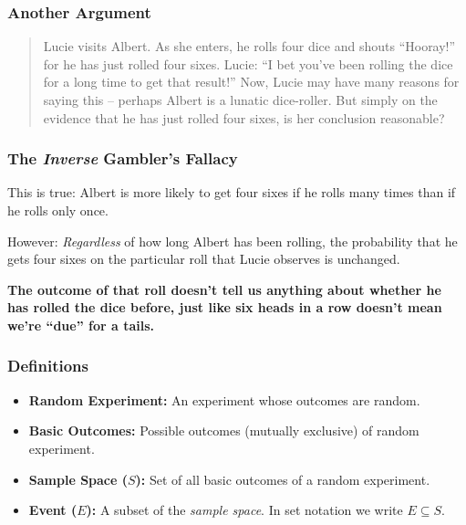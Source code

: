 \documentclass{beamer}
\begin{document}
\begin{frame}
\frametitle{Another Argument}
	\begin{quote}
	Lucie visits Albert. As she enters, he rolls four dice and shouts ``Hooray!'' for he has just rolled 
	four sixes. Lucie: ``I bet you've been rolling the dice for a long time to get that result!'' Now, Lucie 
	may have many reasons for saying this -- perhaps Albert is a lunatic dice-roller. But simply on the 
	evidence that he has just rolled four sixes, is her conclusion reasonable?
	\end{quote}
\end{frame}
\begin{frame}
\frametitle{The \emph{Inverse} Gambler's Fallacy}
	\begin{block}{This is true:}
	    Albert is more likely to get four sixes if he rolls many times than if he rolls only once.
	\end{block}
	\begin{block}{However:} 
	    \emph{Regardless} of how long Albert has been rolling, the probability that he gets four sixes 
	    \alert{on the particular roll that Lucie observes} is unchanged. 
    \end{block}
	\vspace{2em}
	\textbf{The outcome of that roll doesn't tell us anything about whether he has rolled the dice 
	before, just like six heads in a row doesn't mean we're ``due'' for a tails.}
\end{frame}

\begin{frame}
\frametitle{Definitions}
    \begin{itemize}
        \item \textbf{Random Experiment:} An experiment whose outcomes are random.
        \item \textbf{Basic Outcomes:} Possible outcomes (mutually exclusive) of random experiment.
        \item \textbf{Sample Space ($S$):} Set of all basic outcomes of a random experiment.
        \item \textbf{Event ($E$):} A subset of the \textit{sample space}. In set notation we write $E 
        \subseteq S$.
    \end{itemize}
\end{frame}
\end{document}
